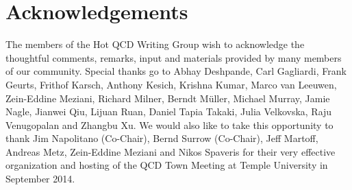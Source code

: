\section{Acknowledgements}
\label{Sec:Acknowledgement}
The members of the Hot QCD Writing Group wish to acknowledge the thoughtful comments, remarks, input and materials provided by many members of our community. Special thanks go to 
Abhay Deshpande,
Carl Gagliardi,
Frank Geurts, 
Frithof Karsch,
Anthony Kesich,  Krishna Kumar, Marco van Leeuwen, 
Zein-Eddine Meziani,
Richard Milner,
Berndt M\"{u}ller,
Michael Murray, 
Jamie Nagle, 
Jianwei Qiu,
Lijuan Ruan, 
Daniel Tapia Takaki, 
Julia Velkovska, 
Raju Venugopalan
and Zhangbu Xu.
We would also like to take this opportunity to thank 
Jim Napolitano (Co-Chair),
Bernd Surrow (Co-Chair),
Jeff Martoff,
Andreas Metz,
Zein-Eddine Meziani
and 
Nikos Spaveris 
for their very effective organization and hosting
of the QCD Town Meeting at Temple University in September 2014.
